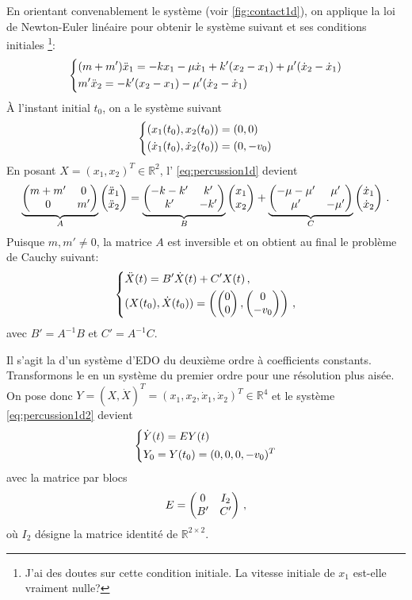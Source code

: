 \noindent En orientant convenablement le système (voir \cref{fig:contact1d}), on applique la loi de Newton-Euler linéaire
pour obtenir le système suivant et ses conditions initiales \footnote{J'ai des doutes sur cette condition
initiale. La vitesse initiale de $x_1$ est-elle vraiment nulle?}:
\begin{align}
    \begin{dcases}
    (m+m')\ddot x_1 = -kx_1 - \mu \dot x_1 + k'(x_2 - x_1) + \mu'(\dot x_2 - \dot x_1) \\
        m' \ddot x_2 =  -k'(x_2 - x_1) - \mu'(\dot x_2 - \dot x_1) 
    \end{dcases}
\end{align}
À l'instant initial $t_0$, on a le système suivant
\begin{align} \label{eq:percussion1d}
    \begin{dcases}
    (x_1(t_0), x_2(t_0)) = (0,0) \\
    (\dot x_1(t_0), \dot x_2(t_0)) = (0,-v_0)
    \end{dcases}
\end{align}
En posant $X = (x_1, x_2)^T \in \mathbb{R}^2$, l' \cref{eq:percussion1d} devient
\begin{align}
    \underbrace{\begin{pmatrix} m+m' & 0 \\ 0 & m' \end{pmatrix}}_{A} \begin{pmatrix} \ddot{x}_1 \\ \ddot{x}_2 \end{pmatrix} = \underbrace{\begin{pmatrix} -k-k' & k' \\ k' & -k' \end{pmatrix}}_{B} \begin{pmatrix} x_1 \\ x_2 \end{pmatrix} + \underbrace{\begin{pmatrix} -\mu -\mu^\prime & \mu' \\ \mu' & -\mu' \end{pmatrix}}_{C} \begin{pmatrix} \dot{x}_1 \\ \dot{x}_2 \end{pmatrix} \,.
\end{align}
Puisque $m, m'\neq 0$, la matrice $A$ est inversible et on obtient au final le problème de Cauchy suivant:
\begin{align} \label{eq:percussion1d2}
    \begin{dcases}
        \ddot{X}(t) = B' \dot{X}(t) + C'X(t) \,, \\
        (X(t_0), \dot X (t_0)) = \left( \begin{pmatrix} 0 \\ 0 \end{pmatrix}, \begin{pmatrix} 0 \\ -v_0 \end{pmatrix} \right) \,,
    \end{dcases}
\end{align}
avec $B' = A^{-1}B$ et $C' = A^{-1}C$.

\noindent Il s'agit la d'un système d'EDO du deuxième ordre à coefficients constants. Transformons le en un système du premier ordre pour
une résolution plus aisée. On pose donc $Y= (X, \dot X)^T = (x_1, x_2, \dot{x}_1, \dot{x}_2)^T \in \mathbb{R}^4$ et le
système
\ref{eq:percussion1d2}
devient
\begin{align} \label{eq:systeme1d}
    \begin{dcases}
        \dot{Y}(t)= E Y(t) \\
        Y_0 = Y(t_0) = (0,0,0,-v_0)^T
    \end{dcases}
\end{align}
avec la matrice par blocs \[ E = \begin{pmatrix} 0 & I_2 \\ B' & C' \end{pmatrix} \,, \] où $I_2$ désigne la matrice identité de
$\mathbb{R}^{2\times2}$.

